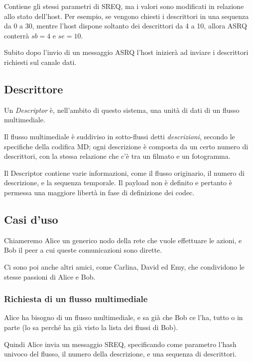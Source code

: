 Contiene gli stessi parametri di SREQ, ma i valori sono
modificati in relazione allo stato dell'host. Per esempio, se vengono chiesti i
descrittori in una sequenza da 0 a 30, mentre l'host dispone soltanto dei
descrittori da 4 a 10, allora ASRQ conterrà $sb=4$ e $se=10$.

Subito dopo l'invio di un messaggio ASRQ l'host inizierà ad inviare i
descrittori richiesti sul canale dati.



\subsection{Descrittore}


Un \emph{Descriptor} è, nell'ambito di questo sistema, una unità di dati di un
flusso multimediale.

Il flusso multimediale è suddiviso in sotto-flussi detti \emph{descrizioni},
secondo le specifiche della codifica MD; ogni descrizione è composta da un certo numero
di descrittori, con la stessa relazione che c'è tra un filmato e un fotogramma.

Il Descriptor contiene varie informazioni, come il flusso originario, il numero
di descrizione, e la sequenza temporale. Il payload non è definito e pertanto è
permessa una maggiore libertà in fase di definizione dei codec.

\subsection{Casi d'uso}

Chiameremo Alice un generico nodo della rete che vuole effettuare le azioni, e
Bob il peer a cui queste comunicazioni sono dirette.

Ci sono poi anche altri amici, come Carlina, David ed Emy, che condividono le
stesse passioni di Alice e Bob.


\subsubsection{Richiesta di un flusso multimediale}
%

Alice ha bisogno di un flusso multimediale, e sa già che Bob ce l'ha, tutto o in
parte (lo sa perché ha già visto la lista dei flussi di Bob).

Quindi Alice invia un messaggio SREQ, specificando come parametro l'hash univoco
del flusso, il numero della descrizione, e una sequenza di descrittori.

